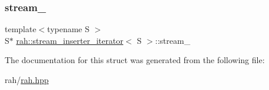 \subsubsection{\texorpdfstring{stream\_}{stream\_}}
{\footnotesize\ttfamily template$<$typename S $>$ \\
S$\ast$ \mbox{\hyperlink{structrah_1_1stream__inserter__iterator}{rah\+::stream\+\_\+inserter\+\_\+iterator}}$<$ S $>$\+::stream\+\_\+}



The documentation for this struct was generated from the following file\+:\begin{DoxyCompactItemize}
\item 
rah/\mbox{\hyperlink{rah_8hpp}{rah.\+hpp}}\end{DoxyCompactItemize}
